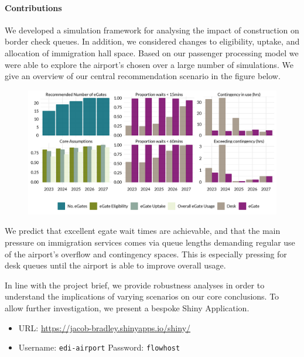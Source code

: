\documentclass[10pt]{article}
\begin{document}
\paragraph{Contributions}
We developed a simulation framework for analysing the impact of  construction on border check queues. In addition, we considered changes to  eligibility, uptake, and allocation of immigration hall space. Based on our passenger processing model we were able to explore the airport's chosen  over a large number of simulations. We give an overview of our central recommendation scenario in the figure below. %
\begin{figure}[!h]
    \centering
    \includegraphics[width=\textwidth]{figures/core_rec_fig.png}
\end{figure}

\vspace{-5pt}

We predict that excellent \gls{egate} wait times are achievable, and that the main pressure on immigration services comes via queue lengths demanding regular use of the airport's overflow and contingency spaces. This is especially pressing for desk queues until the airport is able to improve overall  usage. 

In line with the project brief, we provide robustness analyses in order to understand the implications of varying scenarios on our core conclusions. To allow further investigation, we present a bespoke Shiny Application. 

\begin{tcolorbox}[
colframe=edi-dark-purple,
colback=edi-light-purple,
fonttitle=\bfseries,
title = {Use our Shiny Application to interactively explore demand scenarios}]
\vspace{-1.5mm}
\begin{itemize}
\item[\ding{40}] URL: \url{https://jacob-bradley.shinyapps.io/shiny/}
\item[\ding{40}] Username: \texttt{edi-airport} \quad Password: \texttt{flowhost}
\vspace{-1.5mm}
\end{itemize}
\end{tcolorbox}
\end{document}
